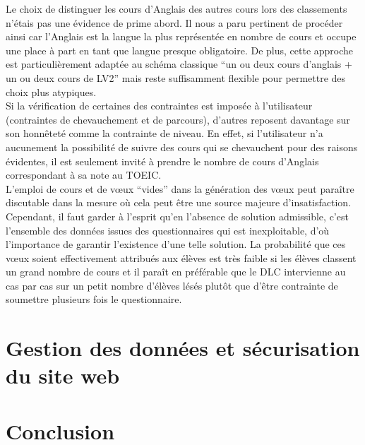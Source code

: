 \documentclass[12pt]{article}
\begin{document}
Le choix de distinguer les cours d’Anglais des autres cours lors des classements n’étais pas une évidence de prime abord. Il nous a paru pertinent de procéder ainsi car l’Anglais est la langue la plus représentée en nombre de cours et occupe une place à part en tant que langue presque obligatoire.  De plus, cette approche est particulièrement adaptée au schéma classique “un ou deux cours d’anglais + un ou deux cours de LV2” mais reste suffisamment flexible pour permettre des choix plus atypiques. \\

Si la vérification de certaines des contraintes est imposée à l’utilisateur (contraintes de chevauchement et de parcours), d’autres reposent davantage sur son honnêteté comme la contrainte de niveau. En effet, si l’utilisateur n’a aucunement la possibilité de suivre des cours qui se chevauchent pour des raisons évidentes, il est seulement invité à prendre le nombre de cours d’Anglais correspondant à sa note au TOEIC. \\

L’emploi de cours et de vœux “vides” dans la génération des vœux peut paraître discutable dans la mesure où cela peut être une source majeure d’insatisfaction. Cependant, il faut garder à l’esprit qu’en l’absence de solution admissible, c’est l’ensemble des données issues des questionnaires qui est inexploitable, d’où l’importance de garantir l’existence d’une telle solution. La probabilité que ces vœux soient effectivement attribués aux élèves est très faible si les élèves classent un grand nombre de cours et il paraît en préférable que le DLC intervienne au cas par cas sur un petit nombre d’élèves lésés plutôt que d’être contrainte de soumettre plusieurs fois le questionnaire. \\
  \subsection{}
    \subsection{}
	
	

  \section{Gestion des données et sécurisation du site web }

	
  \section{Conclusion}
\end{document}
